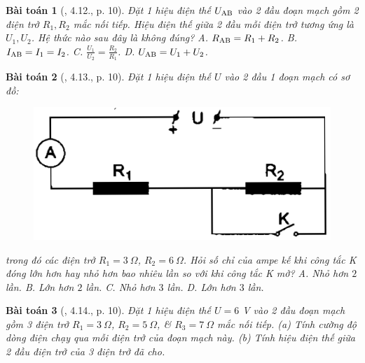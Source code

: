 \documentclass{article}
\newtheorem{baitoan}{Bài toán}
\begin{document}
\begin{baitoan}[\cite{SBT_Vat_Ly_9}, 4.12., p. 10]
	Đặt 1 hiệu điện thế $U_{\rm AB}$ vào 2 đầu đoạn mạch gồm 2 điện trở $R_1,R_2$ mắc nối tiếp. Hiệu điện thế giữa 2 đầu mỗi điện trở tương ứng là $U_1,U_2$. Hệ thức nào sau đây là không đúng? {\sf A.} $R_{\rm AB} = R_1 + R_2$. {\sf B.} $I_{\rm AB} = I_1 = I_2$. {\sf C.} $\frac{U_1}{U_2} = \frac{R_2}{R_1}$. {\sf D.} $U_{\rm AB} = U_1 + U_2$.
\end{baitoan}

\begin{baitoan}[\cite{SBT_Vat_Ly_9}, 4.13., p. 10]
	Đặt 1 hiệu điện thế $U$ vào 2 đầu 1 đoạn mạch có sơ đồ:
	\begin{figure}[H]
		\centering
		\includegraphics[scale=0.25]{SBT_4.3}
	\end{figure}
	\noindent trong đó các điện trở $R_1 = 3\ \Omega$, $R_2 = 6\ \Omega$. Hỏi số chỉ của ampe kế khi công tắc K đóng lớn hơn hay nhỏ hơn bao nhiêu lần so với khi công tắc K mở? {\sf A.} Nhỏ hơn $2$ lần. {\sf B.} Lớn hơn $2$ lần. {\sf C.} Nhỏ hơn $3$ lần. {\sf D.} Lớn hơn $3$ lần.
\end{baitoan}

\begin{baitoan}[\cite{SBT_Vat_Ly_9}, 4.14., p. 10]
	Đặt 1 hiệu điện thế $U = 6$ \emph{V} vào 2 đầu đoạn mạch gồm 3 điện trở $R_1 = 3\ \Omega$, $R_2 = 5\ \Omega$, \& $R_3 = 7\ \Omega$ mắc nối tiếp. (a) Tính cường độ dòng điện chạy qua mỗi điện trở của đoạn mạch này. (b) Tính hiệu điện thế giữa 2 đầu điện trở của 3 điện trở đã cho.
\end{baitoan}
\end{document}
